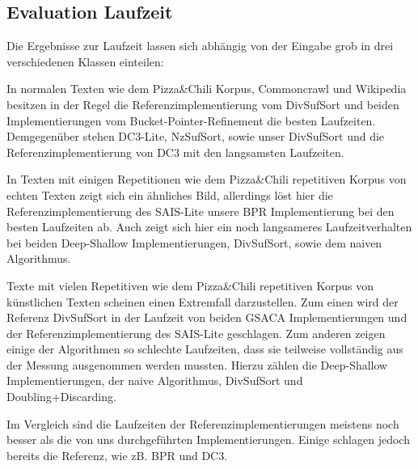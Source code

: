 \subsection{Evaluation Laufzeit}

Die Ergebnisse zur Laufzeit lassen sich abhängig von der Eingabe grob in drei verschiedenen Klassen einteilen:

In normalen Texten wie dem Pizza\&Chili Korpus, Commoncrawl und Wikipedia besitzen in der Regel die Referenzimplementierung vom DivSufSort und beiden Implementierungen vom Bucket-Pointer-Refinement die besten Laufzeiten. Demgegenüber stehen DC3-Lite, NzSufSort, sowie unser DivSufSort und die Referenzimplementierung von DC3 mit den langsamsten Laufzeiten.

In Texten mit einigen Repetitionen wie dem  Pizza\&Chili repetitiven Korpus von echten Texten zeigt sich ein ähnliches Bild, allerdings löst hier die Referenzimplementierung des SAIS-Lite unsere BPR Implementierung bei den besten Laufzeiten ab. Auch zeigt sich hier ein noch langsameres Laufzeitverhalten bei beiden Deep-Shallow Implementierungen, DivSufSort, sowie dem naiven Algorithmus.

Texte mit vielen Repetitiven wie dem Pizza\&Chili repetitiven Korpus von künstlichen Texten scheinen einen Extremfall darzustellen. Zum einen wird der Referenz DivSufSort in der Laufzeit von beiden GSACA Implementierungen und der Referenzimplementierung des SAIS-Lite geschlagen. Zum anderen zeigen einige der Algorithmen so schlechte Laufzeiten, dass sie teilweise vollständig aus der Messung ausgenommen werden mussten. Hierzu zählen die Deep-Shallow Implementierungen, der naive Algorithmus, DivSufSort und Doubling+Discarding.

Im Vergleich sind die Laufzeiten der Referenzimplementierungen meistens noch besser als die von uns durchgeführten Implementierungen. Einige schlagen jedoch bereits die Referenz, wie zB. BPR und DC3.
